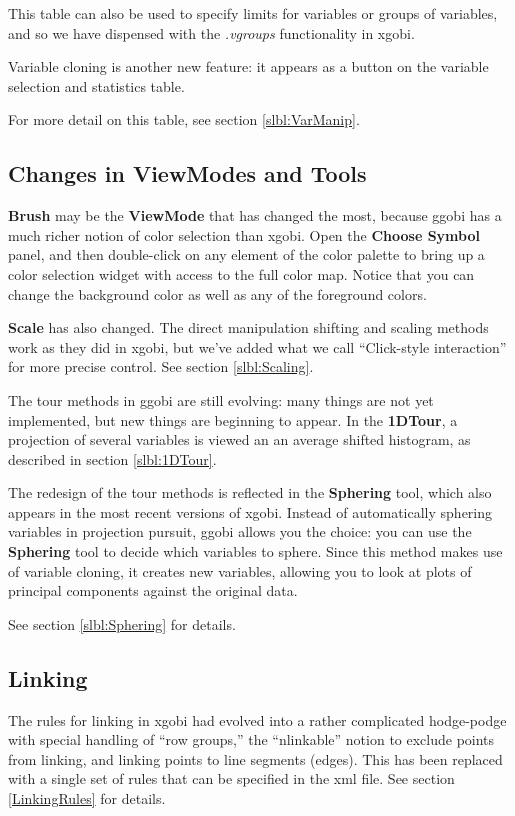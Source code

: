 \documentclass[11pt]{article}
\begin{document}
This table can also be used to specify limits for variables or groups
of variables, and so we have dispensed with the {\em .vgroups}
functionality in xgobi.

Variable cloning is another new feature: it appears as a button
on the variable selection and statistics table.

For more detail on this table, see section \ref{slbl:VarManip}.

\subsection{Changes in ViewModes and Tools}

{\bf Brush} may be the {\bf ViewMode} that has changed the most,
because ggobi has a much richer notion of color selection than
xgobi.  Open the {\bf Choose Symbol} panel, and then double-click on
any element of the color palette to bring up a color selection widget
with access to the full color map.  Notice that you can change the
background color as well as any of the foreground colors.

{\bf Scale} has also changed.  The direct manipulation shifting and
scaling methods work as they did in xgobi, but we've added  what we
call ``Click-style interaction'' for more precise control.  See section
\ref{slbl:Scaling}.

The tour methods in ggobi are still evolving: many things are not yet
implemented, but new things are beginning to appear.  In the {\bf
1DTour}, a projection of several variables is viewed an an average
shifted histogram, as described in section \ref{slbl:1DTour}.

The redesign of the tour methods is reflected in the {\bf Sphering}
tool, which also appears in the most recent versions of xgobi.
Instead of automatically sphering variables in projection pursuit,
ggobi allows you the choice:  you can use the {\bf Sphering} tool to
decide which variables to sphere.  Since this method makes use of
variable cloning, it creates new variables, allowing you to look at
plots of principal components against the original data.

See section \ref{slbl:Sphering} for details.

\subsection{Linking}

The rules for linking in xgobi had evolved into a rather complicated
hodge-podge with special handling of ``row groups,'' the
``nlinkable'' notion to exclude points from linking, and linking
points to line segments (edges).  This has been replaced with a single set
of rules that can be specified in the xml file.  See section 
\ref{LinkingRules} for details.
\end{document}
